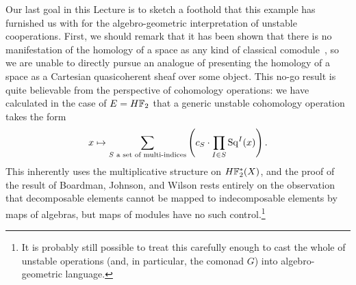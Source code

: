 Our last goal in this Lecture is to sketch a foothold that this example has furnished us with for the algebro-geometric interpretation of unstable cooperations.  First, we should remark that it has been shown that there is no manifestation of the homology of a space as any kind of classical comodule~\cite[Theorem 9.4]{BJW}, so we are unable to directly pursue an analogue of  presenting the homology of a space as a Cartesian quasicoherent sheaf over some object.  This no-go result is quite believable from the perspective of cohomology operations: we have calculated in the case of \(E = \HFtwo\) that a generic unstable cohomology operation takes the form \[x \mapsto \sum_{\text{\(S\) a set of multi-indices}} \left(c_S \cdot \prod_{I \in S} \operatorname{Sq}^I(x)\right).\]  This inherently uses the multiplicative structure on \(\HFtwo^*(X)\), and the proof of the result of Boardman, Johnson, and Wilson rests entirely on the observation that decomposable elements cannot be mapped to indecomposable elements by maps of algebras, but maps of modules have no such control.\footnote{It is probably still possible to treat this carefully enough to cast the whole of unstable operations (and, in particular, the comonad \(G\)) into algebro-geometric language.}


